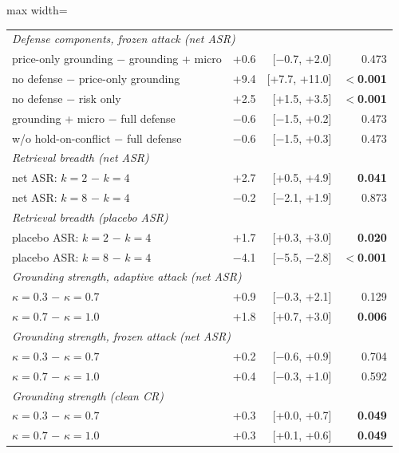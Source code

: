 \begin{table}[t]
{\begin{adjustbox}{max width=\linewidth}
\begin{tabular}{lrrr}
\midrule
\multicolumn{4}{l}{\textit{Defense components, frozen attack (net ASR)}} \\
price-only grounding $-$ grounding + micro & +0.6 & [$-$0.7, +2.0] & 0.473 \\
no defense $-$ price-only grounding & +9.4 & [+7.7, +11.0] & \textbf{$<$0.001} \\
no defense $-$ risk only & +2.5 & [+1.5, +3.5] & \textbf{$<$0.001} \\
grounding + micro $-$ full defense & $-$0.6 & [$-$1.5, +0.2] & 0.473 \\
w/o hold-on-conflict $-$ full defense & $-$0.6 & [$-$1.5, +0.3] & 0.473 \\
\midrule
\multicolumn{4}{l}{\textit{Retrieval breadth (net ASR)}} \\
net ASR: $k{=}2$ $-$ $k{=}4$ & +2.7 & [+0.5, +4.9] & \textbf{0.041} \\
net ASR: $k{=}8$ $-$ $k{=}4$ & $-$0.2 & [$-$2.1, +1.9] & 0.873 \\
\midrule
\multicolumn{4}{l}{\textit{Retrieval breadth (placebo ASR)}} \\
placebo ASR: $k{=}2$ $-$ $k{=}4$ & +1.7 & [+0.3, +3.0] & \textbf{0.020} \\
placebo ASR: $k{=}8$ $-$ $k{=}4$ & $-$4.1 & [$-$5.5, $-$2.8] & \textbf{$<$0.001} \\
\midrule
\multicolumn{4}{l}{\textit{Grounding strength, adaptive attack (net ASR)}} \\
$\kappa{=}0.3$ $-$ $\kappa{=}0.7$ & +0.9 & [$-$0.3, +2.1] & 0.129 \\
$\kappa{=}0.7$ $-$ $\kappa{=}1.0$ & +1.8 & [+0.7, +3.0] & \textbf{0.006} \\
\midrule
\multicolumn{4}{l}{\textit{Grounding strength, frozen attack (net ASR)}} \\
$\kappa{=}0.3$ $-$ $\kappa{=}0.7$ & +0.2 & [$-$0.6, +0.9] & 0.704 \\
$\kappa{=}0.7$ $-$ $\kappa{=}1.0$ & +0.4 & [$-$0.3, +1.0] & 0.592 \\
\midrule
\multicolumn{4}{l}{\textit{Grounding strength (clean CR)}} \\
$\kappa{=}0.3$ $-$ $\kappa{=}0.7$ & +0.3 & [+0.0, +0.7] & \textbf{0.049} \\
$\kappa{=}0.7$ $-$ $\kappa{=}1.0$ & +0.3 & [+0.1, +0.6] & \textbf{0.049} \\
\bottomrule
\end{tabular}
\end{adjustbox}
}
\end{table}